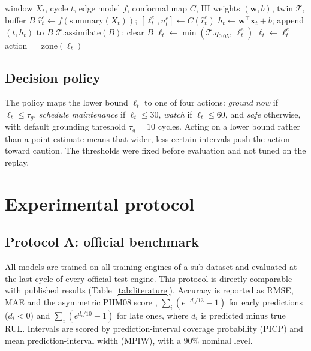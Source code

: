 \documentclass[preprint,12pt,authoryear]{elsarticle}
\begin{document}
\begin{algorithm}[t]
\caption{Per-cycle hybrid estimator for one engine}\label{alg:hybrid}
\begin{algorithmic}[1]
\Require window $X_t$, cycle $t$, edge model $f$, conformal map $C$, HI weights $(\mathbf{w}, b)$, twin $\mathcal{T}$, buffer $B$
\State $\hat r^{e}_t \gets f(\mathrm{summary}(X_t))$; \quad $[\ell^{e}_t, u^{e}_t] \gets C(\hat r^{e}_t)$
\State $h_t \gets \mathbf{w}^\top \mathbf{x}_t + b$; \quad append $(t, h_t)$ to $B$
  \State $\mathcal{T}.\mathrm{assimilate}(B)$; \quad clear $B$
  \State $\ell_t \gets \min(\mathcal{T}.q_{0.05},\ \ell^{e}_t)$
\Else
  \State $\ell_t \gets \ell^{e}_t$
\EndIf
\State \Return action $= \mathrm{zone}(\ell_t)$
\end{algorithmic}
\end{algorithm}

\subsection{Decision policy}\label{sec:policy}
The policy maps the lower bound $\ell_t$ to one of four actions: \emph{ground now} if $\ell_t \le \tau_g$, \emph{schedule maintenance} if $\ell_t \le 30$, \emph{watch} if $\ell_t \le 60$, and \emph{safe} otherwise, with default grounding threshold $\tau_g = 10$ cycles. Acting on a lower bound rather than a point estimate means that wider, less certain intervals push the action toward caution. The thresholds were fixed before evaluation and not tuned on the replay.

\section{Experimental protocol}\label{sec:protocol}

\subsection{Protocol A: official benchmark}
All models are trained on all training engines of a sub-dataset and evaluated at the last cycle of every official test engine. This protocol is directly comparable with published results (Table~\ref{tab:literature}). Accuracy is reported as RMSE, MAE and the asymmetric PHM08 score \citep{saxena2008damage}, $\sum_i (e^{-d_i/13}-1)$ for early predictions ($d_i<0$) and $\sum_i (e^{d_i/10}-1)$ for late ones, where $d_i$ is predicted minus true RUL. Intervals are scored by prediction-interval coverage probability (PICP) and mean prediction-interval width (MPIW), with a 90\% nominal level.
\end{document}

